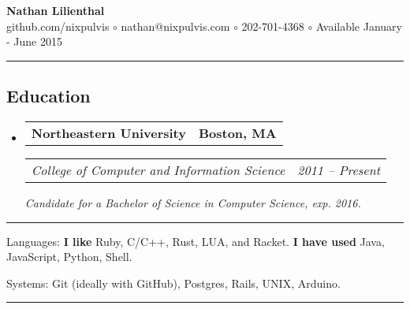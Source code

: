 \documentclass[10pt,letterpaper]{article}
\makeatletter
\newenvironment{indentsection}[1]
{\begin{list}{}
  {\setlength{\leftmargin}{#1}} \item[]
}
{\end{list}}
\newcommand{\headerrow}[2]
{\begin{tabular*}{\linewidth}{l@{\extracolsep{\fill}}r}
  #1 &
  #2 \\
\end{tabular*}}
\makeatother
\begin{document}
\begin{center}
  \huge \textbf{Nathan Lilienthal} \\
  \large
  github.com/nixpulvis
  $\circ$
  nathan@nixpulvis.com
  $\circ$
  202-701-4368
  $\circ$
  Available January - June 2015
  \vspace{-0.2em}
\end{center}

\hrule
\vspace{-0.4em}
\subsection*{Education}
\begin{itemize}
  \parskip=0.1em

  \item
  \headerrow
    {\textbf{Northeastern University}}
    {\textbf{Boston, MA}}
  \headerrow
    {\emph{College of Computer and Information Science}}
    {\emph{2011 -- Present}}
    {\emph{Candidate for a Bachelor of Science in Computer Science, exp. 2016.}}
\end{itemize}


\hrule
\begin{indentsection}{\parindent}
\begin{description*}
  \item[Languages:]
  {\bf I like} Ruby, C/C++, Rust, LUA, and Racket. {\bf I have used} Java, JavaScript, Python, Shell.
  \item[Systems:]
  Git (ideally with GitHub), Postgres, Rails, UNIX, Arduino.
\end{description*}
\end{indentsection}


\hrule
\vspace{-0.4em}
\end{document}
